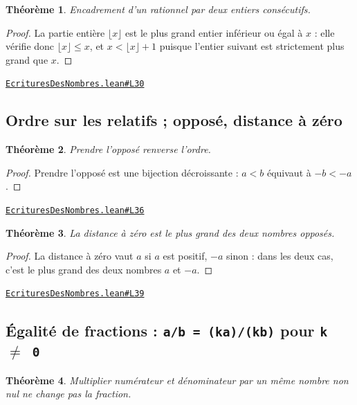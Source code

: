 \documentclass[11pt,a4paper]{article}
\theoremstyle{definition}
\theoremstyle{plain}
\newtheorem{theoreme}{Théorème}
\newcommand{\source}[2]{\par\smallskip\noindent\hfill{\footnotesize\href{#1}{\texttt{#2}}}\par\smallskip}
\begin{document}
\begin{theoreme}
Encadrement d'un rationnel par deux entiers consécutifs.
\end{theoreme}

\begin{proof}
La partie entière $\lfloor x \rfloor$ est le plus grand entier inférieur ou égal à
$x$ : elle vérifie donc $\lfloor x \rfloor \le x$, et $x < \lfloor x \rfloor + 1$ puisque
l'entier suivant est strictement plus grand que $x$.
\end{proof}
\source{https://github.com/Commutator-IO/learn-lean/blob/main/cours/01-college/01-nombres-et-calculs/EcrituresDesNombres.lean\#L30}{EcrituresDesNombres.lean\#L30}

\subsection{Ordre sur les relatifs ; opposé, distance à zéro}

\begin{theoreme}
Prendre l'opposé renverse l'ordre.
\end{theoreme}

\begin{proof}
Prendre l'opposé est une bijection décroissante : $a < b$ équivaut à $-b < -a$.
\end{proof}
\source{https://github.com/Commutator-IO/learn-lean/blob/main/cours/01-college/01-nombres-et-calculs/EcrituresDesNombres.lean\#L36}{EcrituresDesNombres.lean\#L36}

\begin{theoreme}
La distance à zéro est le plus grand des deux nombres opposés.
\end{theoreme}

\begin{proof}
La distance à zéro vaut $a$ si $a$ est positif, $-a$ sinon : dans les deux cas,
c'est le plus grand des deux nombres $a$ et $-a$.
\end{proof}
\source{https://github.com/Commutator-IO/learn-lean/blob/main/cours/01-college/01-nombres-et-calculs/EcrituresDesNombres.lean\#L39}{EcrituresDesNombres.lean\#L39}

\subsection{Égalité de fractions : \texttt{a/b = (ka)/(kb)} pour \texttt{k \(\ne\) 0}}

\begin{theoreme}
Multiplier numérateur et dénominateur par un même nombre non nul ne change pas la
fraction.
\end{theoreme}
\end{document}
